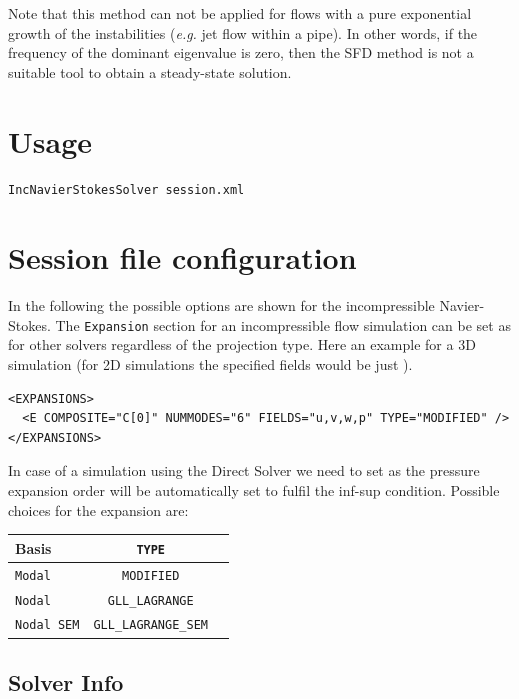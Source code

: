 Note that this method can not be applied for flows with a pure exponential growth of the instabilities (\textit{e.g.} jet flow within a pipe). In other words, if the frequency of the dominant eigenvalue is zero, then the SFD method is not a suitable tool to obtain a steady-state solution.



\section{Usage}

\begin{lstlisting}[style=BashInputStyle]
IncNavierStokesSolver session.xml
\end{lstlisting}

\section{Session file configuration}

In the following the possible options are shown for the incompressible
Navier-Stokes. The \texttt{Expansion} section for an incompressible flow
simulation can be set as for other solvers regardless of the projection type.
Here an example for a 3D simulation (for 2D simulations the specified fields
would be just ).

\begin{lstlisting}[style=XMLStyle]
<EXPANSIONS>
  <E COMPOSITE="C[0]" NUMMODES="6" FIELDS="u,v,w,p" TYPE="MODIFIED" />
</EXPANSIONS>
\end{lstlisting}

In case of a simulation using the Direct Solver we need to set
 as the pressure expansion order will be automatically set to
fulfil the inf-sup condition. Possible choices for the expansion 
are:
\begin{center}
\footnotesize
\begin{tabular}{lcc}
\toprule
{Basis} & {\texttt{TYPE}} \\
\midrule
\texttt{Modal} & \texttt{MODIFIED} \\
\texttt{Nodal} & \texttt{GLL\_LAGRANGE} \\
\texttt{Nodal SEM} & \texttt{GLL\_LAGRANGE\_SEM} \\
\bottomrule
\end{tabular}
\end{center}

\subsection{Solver Info}
\label{SectionIncNS_SolverInfo}

